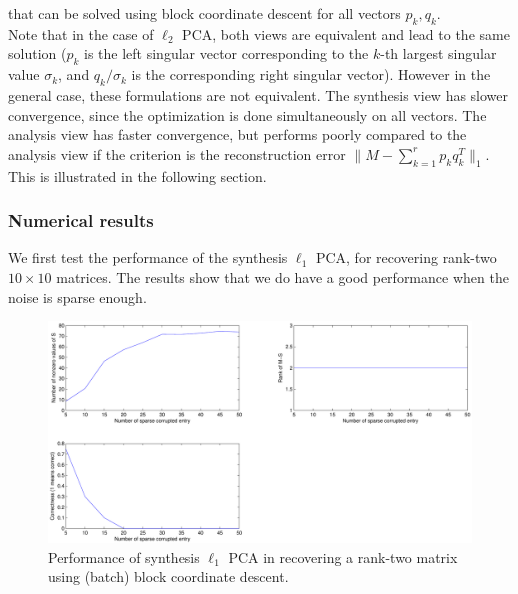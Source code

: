 that can be solved using block coordinate descent for all vectors $p_k, q_k$.
\\

Note that in the case of $\ell_2$ PCA, both views are equivalent and lead to the same solution ($p_k$ is the left singular vector corresponding to the $k$-th largest singular value $\sigma_k$, and $q_k / \sigma_k$ is the corresponding right singular vector). However in the general case, these formulations are not equivalent. The synthesis view has slower convergence, since the optimization is done simultaneously on all vectors. The analysis view has faster convergence, but performs poorly compared to the analysis view if the criterion is the reconstruction error $\| M - \sum_{k=1}^{r} p_k q_k^T \|_1$. This is illustrated in the following section.

\newpage
\subsubsection{Numerical results}
We first test the performance of the synthesis $\ell_1$ PCA, for recovering rank-two $10\times 10$ matrices. The results show that we do have a good performance when the noise is sparse enough.
%
\begin{figure}[h!]
\centering
\includegraphics[width=\textwidth]{../figures/rank2case.pdf}
\caption{Performance of synthesis $\ell_1$ PCA in recovering a rank-two matrix using (batch) block coordinate descent.}
\label{fig:rank2}
\end{figure}

